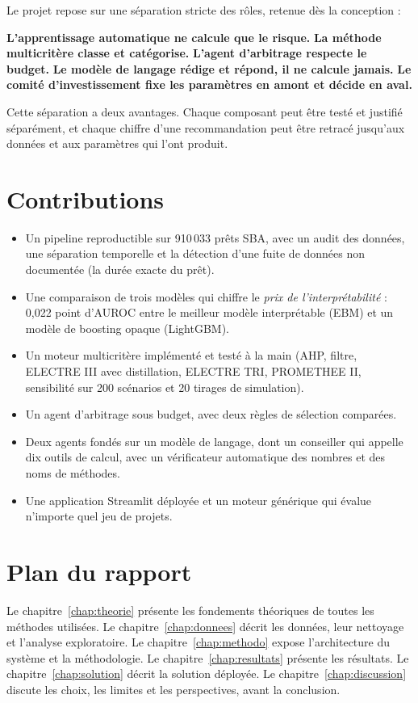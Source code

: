 Le projet repose sur une séparation stricte des rôles, retenue dès la conception :

\begin{encadre}
\textbf{L'apprentissage automatique ne calcule que le risque.} \textbf{La méthode multicritère classe et catégorise.}
\textbf{L'agent d'arbitrage respecte le budget.} \textbf{Le modèle de langage rédige et répond, il ne calcule jamais.}
\textbf{Le comité d'investissement fixe les paramètres en amont et décide en aval.}
\end{encadre}

Cette séparation a deux avantages. Chaque composant peut être testé et justifié séparément, et chaque chiffre d'une
recommandation peut être retracé jusqu'aux données et aux paramètres qui l'ont produit.

\section{Contributions}

\begin{itemize}
  \item Un pipeline reproductible sur 910\,033 prêts SBA, avec un audit des données, une séparation temporelle et la
        détection d'une fuite de données non documentée (la durée exacte du prêt).
  \item Une comparaison de trois modèles qui chiffre le \emph{prix de l'interprétabilité} : 0,022 point d'AUROC entre
        le meilleur modèle interprétable (EBM) et un modèle de boosting opaque (LightGBM).
  \item Un moteur multicritère implémenté et testé à la main (AHP, filtre, ELECTRE III avec distillation, ELECTRE TRI,
        PROMETHEE II, sensibilité sur 200 scénarios et 20 tirages de simulation).
  \item Un agent d'arbitrage sous budget, avec deux règles de sélection comparées.
  \item Deux agents fondés sur un modèle de langage, dont un conseiller qui appelle dix outils de calcul, avec un
        vérificateur automatique des nombres et des noms de méthodes.
  \item Une application Streamlit déployée et un moteur générique qui évalue n'importe quel jeu de projets.
\end{itemize}

\section{Plan du rapport}

Le chapitre~\ref{chap:theorie} présente les fondements théoriques de toutes les méthodes utilisées. Le
chapitre~\ref{chap:donnees} décrit les données, leur nettoyage et l'analyse exploratoire. Le
chapitre~\ref{chap:methodo} expose l'architecture du système et la méthodologie. Le chapitre~\ref{chap:resultats}
présente les résultats. Le chapitre~\ref{chap:solution} décrit la solution déployée. Le
chapitre~\ref{chap:discussion} discute les choix, les limites et les perspectives, avant la conclusion.
